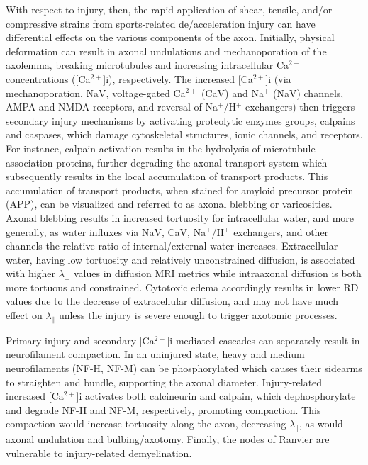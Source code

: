\documentclass[12pt]{article}
\begin{document}
With respect to injury, then, the rapid application of shear, tensile, and/or compressive strains from sports-related de/acceleration injury can have differential effects on the various components of the axon. Initially, physical deformation can result in axonal undulations and mechanoporation of the axolemma, breaking microtubules and increasing intracellular Ca$^{2+}$ concentrations ([Ca$^{2+}$]i), respectively. The increased [Ca$^{2+}$]i (via mechanoporation, NaV, voltage-gated Ca$^{2+}$ (CaV) and Na$^+$ (NaV) channels, AMPA and NMDA receptors, and reversal of Na$^+$/H$^+$ exchangers) then triggers secondary injury mechanisms by activating proteolytic enzymes groups, calpains and caspases, which damage cytoskeletal structures, ionic channels, and receptors. For instance, calpain activation results in the hydrolysis of microtubule-association proteins, further degrading the axonal transport system which subsequently results in the local accumulation of transport products. This accumulation of transport products, when stained for amyloid precursor protein (APP), can be visualized and referred to as axonal blebbing or varicosities. Axonal blebbing results in increased tortuosity for intracellular water, and more generally, as water influxes via NaV, CaV, Na$^+$/H$^+$ exchangers, and other channels the relative ratio of internal/external water increases. Extracellular water, having low tortuosity and relatively unconstrained diffusion, is associated with higher $\lambda_\perp$ values in diffusion MRI metrics while intraaxonal diffusion is both more tortuous and constrained. Cytotoxic edema accordingly results in lower RD values due to the decrease of extracellular diffusion, and may not have much effect on $\lambda_\parallel$ unless the injury is severe enough to trigger axotomic processes.

Primary injury and secondary [Ca$^{2+}$]i mediated cascades can separately result in neurofilament compaction. In an uninjured state, heavy and medium neurofilaments (NF-H, NF-M) can be phosphorylated which causes their sidearms to straighten and bundle, supporting the axonal diameter. Injury-related increased [Ca$^{2+}$]i activates both calcineurin and calpain, which dephosphorylate and degrade NF-H and NF-M, respectively, promoting compaction. This compaction would increase tortuosity along the axon, decreasing $\lambda_\parallel$, as would axonal undulation and bulbing/axotomy. Finally, the nodes of Ranvier are vulnerable to injury-related demyelination.

\end{document}
